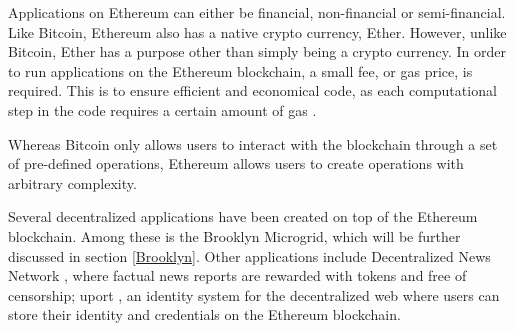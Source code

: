Applications on Ethereum can either be financial, non-financial or semi-financial. Like Bitcoin, Ethereum also has a native crypto currency, Ether. However, unlike Bitcoin, Ether has a purpose other than simply being a crypto currency. In order to run applications on the Ethereum blockchain, a small fee, or gas price, is required. This is to ensure efficient and economical code, as each computational step in the code requires a certain amount of gas \cite{ether_white_paper}.

Whereas Bitcoin only allows users to interact with the blockchain through a set of pre-defined operations, Ethereum allows users to create operations with arbitrary complexity.

Several decentralized applications have been created on top of the Ethereum blockchain. Among these is the Brooklyn Microgrid, which will be further discussed in section \ref{Brooklyn}. Other applications include Decentralized News Network \cite{DNN}, where factual news reports are rewarded with tokens and free of censorship; uport \cite{uport}, an identity system for the decentralized web where users can store their identity and credentials on the Ethereum blockchain.




